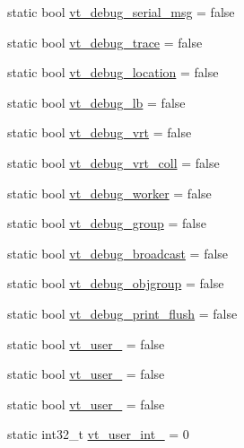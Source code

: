 \begin{DoxyCompactItemize}
\item 
static bool \hyperlink{structvt_1_1arguments_1_1_arg_config_a8823380fec70a43d1179bcbbef969b1f}{vt\+\_\+debug\+\_\+serial\+\_\+msg} = false
\item 
static bool \hyperlink{structvt_1_1arguments_1_1_arg_config_a526c1e1f5819dd2296fed29673a14fbe}{vt\+\_\+debug\+\_\+trace} = false
\item 
static bool \hyperlink{structvt_1_1arguments_1_1_arg_config_a6aba4c0733b232a7bc1889e063185d75}{vt\+\_\+debug\+\_\+location} = false
\item 
static bool \hyperlink{structvt_1_1arguments_1_1_arg_config_a855ec23d7e91d2d7b6dc102c0e9f4b7a}{vt\+\_\+debug\+\_\+lb} = false
\item 
static bool \hyperlink{structvt_1_1arguments_1_1_arg_config_aa50afb2441de7797225ec882ae42ab73}{vt\+\_\+debug\+\_\+vrt} = false
\item 
static bool \hyperlink{structvt_1_1arguments_1_1_arg_config_ad5a4ae4f09e2cb77100e5622e2d5e690}{vt\+\_\+debug\+\_\+vrt\+\_\+coll} = false
\item 
static bool \hyperlink{structvt_1_1arguments_1_1_arg_config_a6386b3a1d890ff781a16546aefb6d642}{vt\+\_\+debug\+\_\+worker} = false
\item 
static bool \hyperlink{structvt_1_1arguments_1_1_arg_config_a858d2cf937f28c93c34d70ef30365664}{vt\+\_\+debug\+\_\+group} = false
\item 
static bool \hyperlink{structvt_1_1arguments_1_1_arg_config_a95bc48ba7cbf5bc30298d47633a15ea5}{vt\+\_\+debug\+\_\+broadcast} = false
\item 
static bool \hyperlink{structvt_1_1arguments_1_1_arg_config_aec0f3598cdf4a78b578a7ac8eaf6f0fc}{vt\+\_\+debug\+\_\+objgroup} = false
\item 
static bool \hyperlink{structvt_1_1arguments_1_1_arg_config_a33abd22d9a5b153b3915eea465ff93e2}{vt\+\_\+debug\+\_\+print\+\_\+flush} = false
\item 
static bool \hyperlink{structvt_1_1arguments_1_1_arg_config_ad4e433d0d0a5e9cbe39a1045194fff3b}{vt\+\_\+user\+\_} = false
\item 
static bool \hyperlink{structvt_1_1arguments_1_1_arg_config_a0c3fedfb03820032fc87969ff3eabd77}{vt\+\_\+user\+\_} = false
\item 
static bool \hyperlink{structvt_1_1arguments_1_1_arg_config_a91c4c1cdfab2def4254db74c705245f6}{vt\+\_\+user\+\_} = false
\item 
static int32\+\_\+t \hyperlink{structvt_1_1arguments_1_1_arg_config_a8592495c8eb82047645a9b5e0b741907}{vt\+\_\+user\+\_\+int\+\_} = 0

\end{DoxyCompactItemize}
